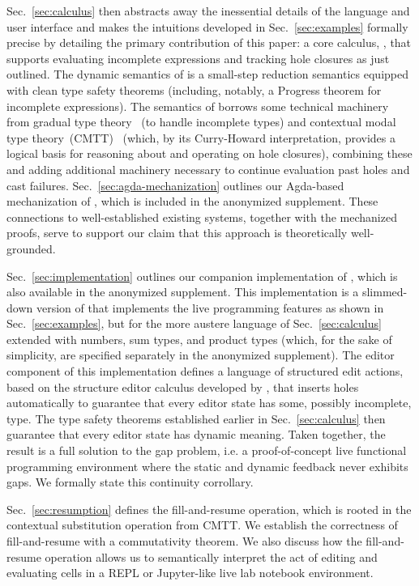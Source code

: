 Sec.~\ref{sec:calculus} then abstracts away the inessential details of the language and user interface and makes the  intuitions developed in Sec.~\ref{sec:examples} formally precise by detailing the primary contribution of this paper: a core calculus, \HazelnutLive, that supports evaluating incomplete expressions and tracking hole closures as just outlined. The dynamic semantics of \HazelnutLive is a small-step reduction semantics equipped with clean type safety theorems (including, notably, a Progress theorem for incomplete expressions). The semantics of \HazelnutLive borrows some technical machinery from gradual type theory~\cite{DBLP:conf/snapl/SiekVCB15}
(to handle incomplete types) and contextual modal type theory~(CMTT)~\cite{Nanevski2008} (which, by its Curry-Howard interpretation, provides a logical basis for reasoning about and operating on hole closures), combining these and adding additional machinery necessary to continue evaluation past holes and cast failures.  
Sec.~\ref{sec:agda-mechanization} outlines our Agda-based mechanization of \HazelnutLive, which is included in the anonymized supplement.  
These connections to well-established existing systems, together with the mechanized proofs, serve to support our claim that this approach is theoretically well-grounded.

Sec.~\ref{sec:implementation} outlines our companion implementation of \HazelnutLive, which is also available in the anonymized supplement. This implementation is a slimmed-down version of \Hazel that implements the live programming features as shown in Sec.~\ref{sec:examples}, 
but for the more austere language of Sec.~\ref{sec:calculus} extended with numbers, sum types, and product types (which, for the sake of simplicity, are specified separately in the anonymized supplement). 
The editor component of this implementation defines a language of structured edit actions, 
based on the \Hazelnut structure editor calculus developed by \citet{popl-paper}, that inserts holes automatically to guarantee that
every editor state has some, possibly incomplete, type. 
The type safety theorems established earlier in Sec.~\ref{sec:calculus} then guarantee that every editor state has dynamic meaning. Taken together, the result is a full solution to the gap problem, i.e. a proof-of-concept
live functional programming environment where the static and dynamic feedback never exhibits gaps. We formally state this continuity corrollary.

Sec.~\ref{sec:resumption} defines the fill-and-resume operation, which is rooted in the contextual substitution operation from CMTT. We establish the correctness of fill-and-resume with a commutativity theorem. We also discuss how the fill-and-resume operation allows us to semantically interpret the act of editing and evaluating cells in a REPL or Jupyter-like live lab notebook environment.


